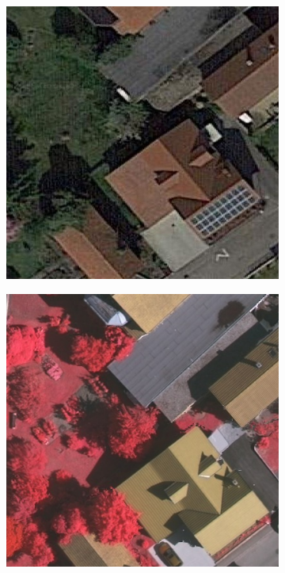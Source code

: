 \begin{figure}[H]
\begin{subfigure}{0.19\columnwidth}
\end{subfigure}

\begin{subfigure}{0.19\columnwidth}
  \centering
  \includegraphics[width=1\linewidth]{fig/comp_manual/building_1_google.jpg}
  \caption{}
\end{subfigure}
\begin{subfigure}{0.19\columnwidth}
  \centering
  \includegraphics[width=1\linewidth]{fig/comp_manual/building_1_rgb.png}  

\end{subfigure}
\end{figure}
